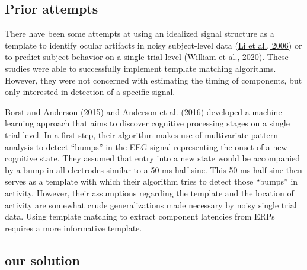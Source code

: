 \documentclass[
  man,floatsintext]{apa7}
\begin{document}
\hypertarget{prior-attempts}{%
\subsection{Prior attempts}\label{prior-attempts}}

There have been some attempts at using an idealized signal structure as a template to identify ocular artifacts in noisy subject-level data (\protect\hyperlink{ref-li2006automatic}{Li et al., 2006}) or to predict subject behavior on a single trial level (\protect\hyperlink{ref-william2020erp}{William et al., 2020}). These studies were able to successfully implement template matching algorithms. However, they were not concerned with estimating the timing of components, but only interested in detection of a specific signal.

Borst and Anderson (\protect\hyperlink{ref-borst2015discovery}{2015}) and Anderson et al. (\protect\hyperlink{ref-anderson2016discovery}{2016}) developed a machine-learning approach that aims to discover cognitive processing stages on a single trial level. In a first step, their algorithm makes use of multivariate pattern analysis to detect ``bumps'' in the EEG signal representing the onset of a new cognitive state. They assumed that entry into a new state would be accompanied by a bump in all electrodes similar to a 50 ms half-sine. This 50 ms half-sine then serves as a template with which their algorithm tries to detect those ``bumps'' in activity. However, their assumptions regarding the template and the location of activity are somewhat crude generalizations made necessary by noisy single trial data. Using template matching to extract component latencies from ERPs requires a more informative template.

\hypertarget{our-solution}{%
\subsection{our solution}\label{our-solution}}
\end{document}
